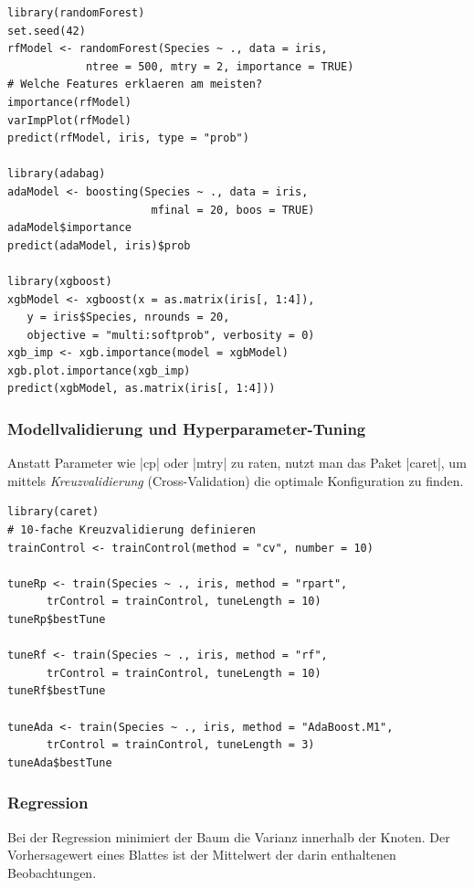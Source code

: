 \documentclass[10pt,twocolumn]{scrartcl}
\renewcommand{\lstinline}{\mycoloredinline}
\begin{document}
\begin{lstlisting}
library(randomForest)
set.seed(42)
rfModel <- randomForest(Species ~ ., data = iris, 
            ntree = 500, mtry = 2, importance = TRUE)
# Welche Features erklaeren am meisten?
importance(rfModel)
varImpPlot(rfModel)
predict(rfModel, iris, type = "prob")

library(adabag)
adaModel <- boosting(Species ~ ., data = iris, 
                      mfinal = 20, boos = TRUE)
adaModel$importance
predict(adaModel, iris)$prob

library(xgboost)
xgbModel <- xgboost(x = as.matrix(iris[, 1:4]), 
   y = iris$Species, nrounds = 20,
   objective = "multi:softprob", verbosity = 0)
xgb_imp <- xgb.importance(model = xgbModel)
xgb.plot.importance(xgb_imp)
predict(xgbModel, as.matrix(iris[, 1:4]))
\end{lstlisting}

\subsubsection{Modellvalidierung und Hyperparameter-Tuning}

Anstatt Parameter wie \lstinline|cp| oder \lstinline|mtry| zu raten, nutzt man das Paket \lstinline|caret|, um mittels \emph{Kreuzvalidierung} (Cross-Validation) die optimale Konfiguration zu finden.

\begin{lstlisting}
library(caret)
# 10-fache Kreuzvalidierung definieren
trainControl <- trainControl(method = "cv", number = 10)

tuneRp <- train(Species ~ ., iris, method = "rpart", 
      trControl = trainControl, tuneLength = 10)
tuneRp$bestTune

tuneRf <- train(Species ~ ., iris, method = "rf",
      trControl = trainControl, tuneLength = 10)
tuneRf$bestTune

tuneAda <- train(Species ~ ., iris, method = "AdaBoost.M1",
      trControl = trainControl, tuneLength = 3)
tuneAda$bestTune
\end{lstlisting}

\subsubsection{Regression}

Bei der Regression minimiert der Baum die Varianz innerhalb der Knoten. Der Vorhersagewert eines Blattes ist der Mittelwert der darin enthaltenen Beobachtungen.
\end{document}
